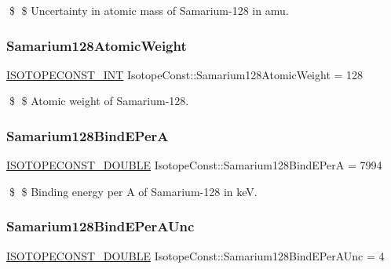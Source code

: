 \$ \$ Uncertainty in atomic mass of Samarium-\/128 in amu. \mbox{\label{group___isotope_const-_samarium-_sm128_ga5d816c97d9907313e9a48e6a6a2d5610}} 
\subsubsection{\texorpdfstring{Samarium128\+Atomic\+Weight}{Samarium128AtomicWeight}}
{\footnotesize\ttfamily \mbox{\hyperlink{group___isotope_const-_macros_ga5f18360b3e99483a35c32d789e62621c}{I\+S\+O\+T\+O\+P\+E\+C\+O\+N\+S\+T\+\_\+\+I\+NT}} Isotope\+Const\+::\+Samarium128\+Atomic\+Weight = 128}

\$ \$ Atomic weight of Samarium-\/128. \mbox{\label{group___isotope_const-_samarium-_sm128_gaa5a1d08b3ab9eb6dd2518490b53ae819}} 
\subsubsection{\texorpdfstring{Samarium128\+Bind\+E\+PerA}{Samarium128BindEPerA}}
{\footnotesize\ttfamily \mbox{\hyperlink{group___isotope_const-_macros_ga8f45a7272ce02c0b4c65c44636ed719a}{I\+S\+O\+T\+O\+P\+E\+C\+O\+N\+S\+T\+\_\+\+D\+O\+U\+B\+LE}} Isotope\+Const\+::\+Samarium128\+Bind\+E\+PerA = 7994}

\$ \$ Binding energy per A of Samarium-\/128 in keV. \mbox{\label{group___isotope_const-_samarium-_sm128_ga7e8ffebfce4d47be20a080c0f7bb132c}} 
\subsubsection{\texorpdfstring{Samarium128\+Bind\+E\+Per\+A\+Unc}{Samarium128BindEPerAUnc}}
{\footnotesize\ttfamily \mbox{\hyperlink{group___isotope_const-_macros_ga8f45a7272ce02c0b4c65c44636ed719a}{I\+S\+O\+T\+O\+P\+E\+C\+O\+N\+S\+T\+\_\+\+D\+O\+U\+B\+LE}} Isotope\+Const\+::\+Samarium128\+Bind\+E\+Per\+A\+Unc = 4}

